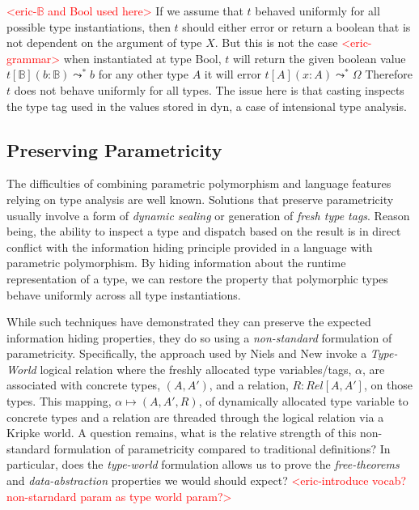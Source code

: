 \documentclass[acmsmall]{acmart}
\newcommand{\eric}[1]{\textcolor{red}{ <eric-#1> }}
\begin{document}
\eric{$\mathbb{B}$ and Bool used here}
If we assume that $t$ behaved uniformly for all possible type instantiations, then $t$ should either error
or return a boolean that is not dependent on the argument of type $X$.
But this is not the case \eric{grammar}
when instantiated at type Bool, $t$ will return the given boolean value
$t[\mathbb{B}](b : \mathbb{B}) \leadsto^* b$ for any other type $A$ it will error
$t[A](x:A)\leadsto^* \Omega$
Therefore $t$ does not behave uniformly for all types. 
The issue here is that casting inspects the type tag used in the values stored in dyn, a case of intensional type analysis.

\subsection{Preserving Parametricity}

The difficulties of combining parametric polymorphism and language features relying on type analysis are well known\cite{NonParam}\cite{GradParam}\cite{ToroGradParam}\cite{ForFreeForFree}.
Solutions that preserve parametricity usually involve a form of \textit{dynamic sealing} or generation of \textit{fresh type tags}. Reason being, the ability to inspect a type and dispatch based on the result is in direct conflict with the information hiding principle provided in a language with parametric polymorphism. By hiding information about the runtime representation of a type, we can restore the property that polymorphic types behave uniformly across all type instantiations.

While such techniques have demonstrated they can preserve the expected information hiding properties, they do so using a \textit{non-standard} formulation of parametricity. Specifically, the approach used by Niels\cite{NonParam} and New\cite{GradParam} invoke a \textit{Type-World} logical relation where the freshly allocated type variables/tags, $\alpha$, are associated with concrete types, $(A,A')$, and a relation, $R : Rel[A,A']$, on those types. This mapping, $\alpha \mapsto (A,A',R)$, of dynamically allocated type variable to concrete types and a relation are threaded through the logical relation via a Kripke world. A question remains, what is the relative strength of this non-standard formulation of parametricity compared to traditional definitions? In particular, does the \textit{type-world} formulation allows us to prove the \textit{free-theorems} and \textit{data-abstraction} properties we would should expect?\eric{introduce vocab? non-starndard param as type world param?}
\end{document}
